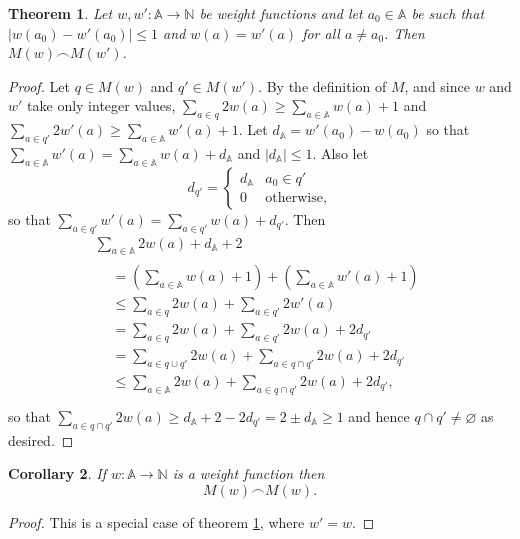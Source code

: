 \documentclass[journal]{IEEEtran}
\newtheorem{theorem}{Theorem}
\newtheorem{corollary}[theorem]{Corollary}
\begin{document}
\begin{theorem} \label{weights-nearly-equal} Let $w, w' : \mathbb A \to \mathbb
N$ be weight functions and let $a_0 \in \mathbb A$ be such that $|w(a_0) -
w'(a_0)| \le 1$ and $w(a) = w'(a)$ for all $a \ne a_0$. Then $M(w) \frown
M(w')$.  \end{theorem}

\begin{proof} Let $q \in M(w)$ and $q' \in M(w')$. By the
  definition of $M$, and since $w$ and $w'$ take only integer values,
%
$\sum_{a \in q} 2 w(a) \ge \sum_{a \in \mathbb A} w(a) + 1$
%
and
%
$\sum_{a \in q'} 2 w'(a) \ge \sum_{a \in \mathbb A} w'(a) + 1$.
%
Let $d_{\mathbb A} = w'(a_0) - w(a_0)$ so that $\sum_{a \in \mathbb A} w'(a) =
\sum_{a \in \mathbb A} w(a) + d_{\mathbb A}$ and $|d_\mathbb A| \le 1$. Also
let \[ d_{q'} =
\begin{cases}
%
d_{\mathbb A} & a_0 \in q' \\
%
0 & \textrm{otherwise,}
%
\end{cases}
\]
so that $\sum_{a \in q'} w'(a) = \sum_{a \in q'} w(a) + d_{q'}$.
%
Then
\begin{gather*}
%
\sum_{a \in \mathbb A} 2w(a) + d_{\mathbb A} + 2 \\
%
\begin{aligned}
%
&= \left( \sum_{a \in \mathbb A} w(a)  + 1\right)
+  \left( \sum_{a \in \mathbb A} w'(a) + 1\right) \\
%
&\le \sum_{a \in q}  2w(a)
+    \sum_{a \in q'} 2w'(a) \\
%
&= \sum_{a \in q}  2w(a)
+  \sum_{a \in q'} 2w(a) + 2d_{q'}\\
%
&= \sum_{a \in q \cup q'} 2w(a)
+  \sum_{a \in q \cap q'} 2w(a) + 2d_{q'}\\
%
&\le \sum_{a \in \mathbb A} 2w(a)
+    \sum_{a \in q \cap q'} 2w(a) + 2d_{q'},\\
%
\end{aligned}\end{gather*} so that $\sum_{a \in q \cap q'} 2w(a) \ge d_{\mathbb
A} + 2 - 2d_{q'} = 2 \pm d_\mathbb A \ge 1$ and hence $q \cap q' \ne \varnothing$ as desired.
\end{proof}

\begin{corollary} \label{weights-equal} If $w : \mathbb A \to \mathbb N$ is a
weight function then \[M(w) \frown M(w).\]  \end{corollary}

\begin{proof}
This is a special case of theorem \ref{weights-nearly-equal}, where $w' = w$.
\end{proof}
\end{document}
